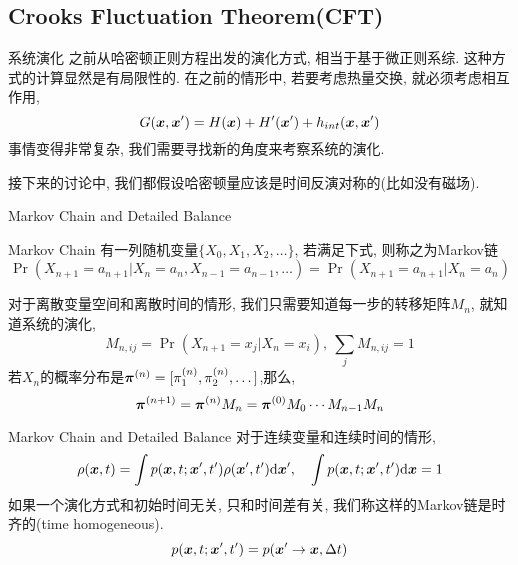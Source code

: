     \subsection{Crooks Fluctuation Theorem(CFT)}
    \begin{frame}{系统演化}
        之前从哈密顿正则方程出发的演化方式, 相当于基于微正则系综. 这种方式的计算显然是有局限性的. 在之前的情形中, 若要考虑热量交换, 就必须考虑相互作用,
        \begin{equation}
            G(\vb*x,\vb*x') = H(\vb*x) + H'(\vb*x') + h_{int}(\vb*x,\vb*x')        
        \end{equation}
        事情变得非常复杂, 我们需要寻找新的角度来考察系统的演化.

        接下来的讨论中, 我们都假设哈密顿量应该是时间反演对称的(比如没有磁场).
    \end{frame}
    \begin{frame}{Markov Chain and Detailed Balance}
        \begin{block}{Markov Chain}
            有一列随机变量$\{X_0,X_1,X_2,\dots\}$, 若满足下式, 则称之为Markov链
            \begin{equation}
                \Pr(X_{n+1}=a_{n+1} | X_{n} = a_n, X_{n-1} = a_{n-1},\dots) = \Pr(X_{n+1}=a_{n+1} | X_{n} = a_n)
            \end{equation}
        \end{block}
        对于离散变量空间和离散时间的情形, 我们只需要知道每一步的转移矩阵$M_n$, 就知道系统的演化,
        \begin{equation}
            M_{n,ij} = \Pr(X_{n+1} = x_j| X_n = x_i),\ \sum_j M_{n,ij} = 1
        \end{equation}
        若$X_n$的概率分布是$\vb*\pi^{(n)} = [\pi^{(n)}_1,\pi^{(n)}_2,\dots]$,那么,
        \begin{equation}
            \vb*\pi^{(n+1)} = \vb*\pi^{(n)}M_n = \vb*\pi^{(0)}M_0\cdots M_{n-1}M_{n}
        \end{equation}
    \end{frame}
    \begin{frame}{Markov Chain and Detailed Balance}
        对于连续变量和连续时间的情形,
        \begin{equation}
            \rho(\vb*x, t) = \int p(\vb*x,t; \vb*x', t') \rho(\vb*x', t')\dd\vb*x', \quad \int p(\vb*x,t; \vb*x', t') \dd\vb*x = 1
        \end{equation}
        如果一个演化方式和初始时间无关, 只和时间差有关, 我们称这样的Markov链是时齐的(time homogeneous).
        \begin{equation}
            p(\vb*x,t; \vb*x',t') = p(\vb*x'\to\vb*x, \Delta t)
        \end{equation}
    \end{frame}
